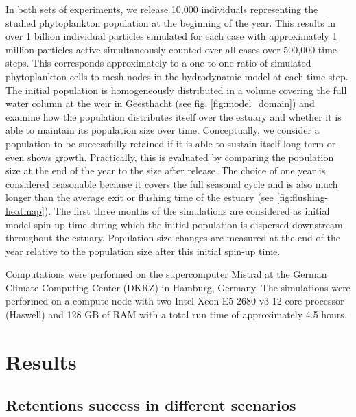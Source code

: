 \documentclass[npg, manuscript]{copernicus}
\begin{document}
In both sets of experiments, we release 10,000 individuals representing the studied phytoplankton population at the beginning of the year.
This results in over 1 billion individual particles simulated for each case with approximately 1 million particles active simultaneously counted over all cases over 500,000 time steps.
This corresponds approximately to a one to one ratio of simulated phytoplankton cells to mesh nodes in the hydrodynamic model at each time step.
The initial population is homogeneously distributed in a volume covering the full water column at the weir in Geesthacht (see fig. \ref{fig:model_domain}) and examine how the population distributes itself over the estuary and whether it is able to maintain its population size over time.
Conceptually, we consider a population to be successfully retained if it is able to sustain itself long term or even shows growth.
Practically, this is evaluated by comparing the population size at the end of the year to the size after release.
The choice of one year is considered reasonable because it covers the full seasonal cycle and is also much longer than the average exit or flushing time of the estuary (see \ref{fig:flushing-heatmap}).
The first three months of the simulations are considered as initial model spin-up time during which the initial population is dispersed downstream throughout the estuary.
Population size changes are measured at the end of the year relative to the population size after this initial spin-up time.

Computations were performed on the supercomputer Mistral at the German Climate Computing Center (DKRZ) in Hamburg, Germany.
The simulations were performed on a compute node with two  Intel Xeon E5-2680 v3 12-core processor (Haswell) and 128 GB of RAM with a total run time of approximately 4.5 hours.

\section{Results}

\subsection{Retentions success in different scenarios}
\end{document}
